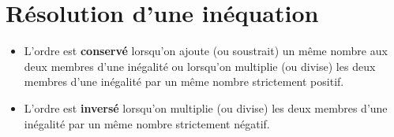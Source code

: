 %
%   


\section{Résolution d'une inéquation} %

\begin{propriete}
   \begin{itemize}
      \item L'ordre est {\bf conservé} lorsqu'on ajoute (ou soustrait) un même nombre aux deux membres d'une inégalité ou lorsqu'on multiplie (ou divise) les deux membres d'une inégalité par un même nombre strictement positif.
      \item L'ordre est {\bf inversé} lorsqu'on multiplie (ou divise) les deux membres d'une inégalité par un même nombre strictement négatif. \\ [-8mm]
   \end{itemize}
\end{propriete}

